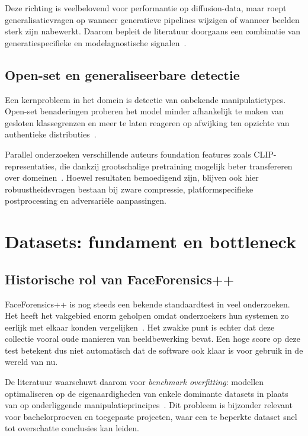 Deze richting is veelbelovend voor performantie op diffusion-data, maar roept generalisatievragen op wanneer generatieve pipelines wijzigen of wanneer beelden sterk zijn nabewerkt. Daarom bepleit de literatuur doorgaans een combinatie van generatiespecifieke en modelagnostische signalen~\autocite{Pei2024,TowardsDiffusion2024}.

\subsection{Open-set en generaliseerbare detectie}
Een kernprobleem in het domein is detectie van onbekende manipulatietypes. Open-set benaderingen proberen het model minder afhankelijk te maken van gesloten klassegrenzen en meer te laten reageren op afwijking ten opzichte van authentieke distributies~\autocite{OpenSet2025}. 

Parallel onderzoeken verschillende auteurs foundation features zoals CLIP-representaties, die dankzij grootschalige pretraining mogelijk beter transfereren over domeinen~\autocite{CLIPDeepfake2025}. Hoewel resultaten bemoedigend zijn, blijven ook hier robuustheidsvragen bestaan bij zware compressie, platformspecifieke postprocessing en adversariële aanpassingen.

\section{Datasets: fundament en bottleneck}

\subsection{Historische rol van FaceForensics++}
FaceForensics++ is nog steeds een bekende standaardtest in veel onderzoeken. Het heeft het vakgebied enorm geholpen omdat onderzoekers hun systemen zo eerlijk met elkaar konden vergelijken~\autocite{Rossler2019}. Het zwakke punt is echter dat deze collectie vooral oude manieren van beeldbewerking bevat. Een hoge score op deze test betekent dus niet automatisch dat de software ook klaar is voor gebruik in de wereld van nu.

De literatuur waarschuwt daarom voor \emph{benchmark overfitting}: modellen optimaliseren op de eigenaardigheden van enkele dominante datasets in plaats van op onderliggende manipulatieprincipes~\autocite{Pei2024,EvaluationModels2025}. Dit probleem is bijzonder relevant voor bachelorproeven en toegepaste projecten, waar een te beperkte dataset snel tot overschatte conclusies kan leiden.

